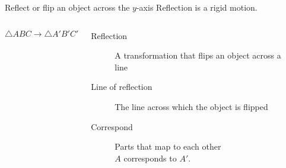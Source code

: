 \begin{frame}{Reflect or flip an object across the $y$-axis}
  {Reflection is a rigid motion.}
  \begin{columns}
    $$\triangle ABC \rightarrow \triangle A'B'C'$$
      \begin{description}
        \item[Reflection] A transformation that flips an object across a line
        \item[Line of reflection] The line across which the object is flipped
        \item[Correspond] Parts that map to each other \\
        $A$ corresponds to $A'$.
      \end{description}
      
    \begin{flushright}
    \end{flushright}
  \end{columns}
\end{frame}

